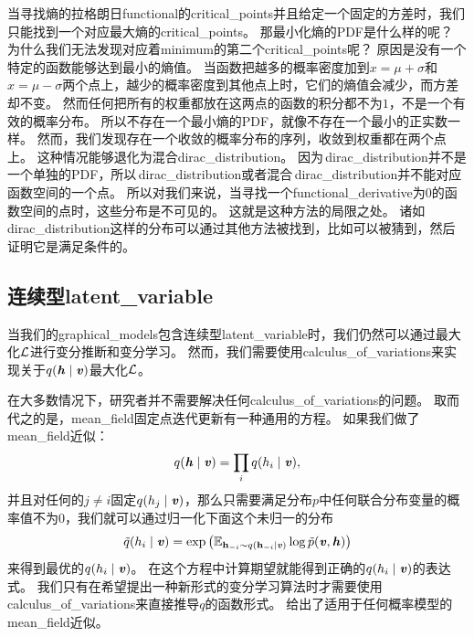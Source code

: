 当寻找熵的拉格朗日\gls{functional}的\gls{critical_points}并且给定一个固定的方差时，我们只能找到一个对应最大熵的\gls{critical_points}。
那最小化熵的\gls{PDF}是什么样的呢？
为什么我们无法发现对应着\gls{minimum}的第二个\gls{critical_points}呢？
原因是没有一个特定的函数能够达到最小的熵值。
当函数把越多的概率密度加到$x = \mu + \sigma$和$x = \mu - \sigma$两个点上，越少的概率密度到其他点上时，它们的熵值会减少，而方差却不变。
然而任何把所有的权重都放在这两点的函数的积分都不为$1$，不是一个有效的概率分布。
所以不存在一个最小熵的\gls{PDF}，就像不存在一个最小的正实数一样。
然而，我们发现存在一个收敛的概率分布的序列，收敛到权重都在两个点上。
这种情况能够退化为混合\gls{dirac_distribution}。
因为\,\gls{dirac_distribution}并不是一个单独的\gls{PDF}，所以\,\gls{dirac_distribution}或者混合\,\gls{dirac_distribution}并不能对应函数空间的一个点。
所以对我们来说，当寻找一个\gls{functional_derivative}为$0$的函数空间的点时，这些分布是不可见的。
这就是这种方法的局限之处。
诸如\,\gls{dirac_distribution}这样的分布可以通过其他方法被找到，比如可以被猜到，然后证明它是满足条件的。



\subsection{连续型\gls{latent_variable}}
\label{sec:continuous_latent_variables}


当我们的\gls{graphical_models}包含连续型\gls{latent_variable}时，我们仍然可以通过最大化$\mathcal{L}$进行变分推断和变分学习。
然而，我们需要使用\gls{calculus_of_variations}来实现关于$q(\boldsymbol{\mathit{h}}\mid\boldsymbol{\mathit{v}})$最大化$\mathcal{L}$。


在大多数情况下，研究者并不需要解决任何\gls{calculus_of_variations}的问题。
取而代之的是，\gls{mean_field}固定点迭代更新有一种通用的方程。
如果我们做了\gls{mean_field}近似：
\begin{align}
\label{eqn:1955}
	q(\boldsymbol{\mathit{h}}\mid\boldsymbol{\mathit{v}}) = \prod_i q(h_i \mid\boldsymbol{\mathit{v}}),
\end{align}
并且对任何的$j\neq i$固定$q(h_j\mid\boldsymbol{\mathit{v}})$，那么只需要满足分布$p$中任何联合分布变量的概率值不为$0$，我们就可以通过归一化下面这个未归一的分布
\begin{align}
	\label{eqn:1956}
	\tilde{q}(h_i \mid\boldsymbol{\mathit{v}}) = \exp \big(\mathbb{E}_{\mathbf{h}_{-i}\sim q(\mathbf{h}_{-i}\mid\boldsymbol{\mathit{v}})}	\log \tilde{p}(\boldsymbol{\mathit{v}},\boldsymbol{\mathit{h}})\big)
\end{align}
来得到最优的$q(h_i\mid\boldsymbol{\mathit{v}})$。
在这个方程中计算期望就能得到正确的$q(h_i\mid\boldsymbol{\mathit{v}})$的表达式。
我们只有在希望提出一种新形式的变分学习算法时才需要使用\gls{calculus_of_variations}来直接推导$q$的函数形式。
给出了适用于任何概率模型的\gls{mean_field}近似。




